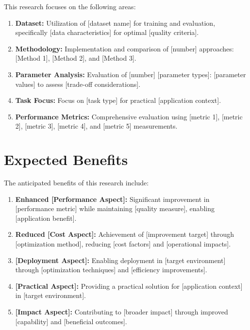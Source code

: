 This research focuses on the following areas:

\begin{enumerate}
\item \textbf{Dataset:} Utilization of [dataset name] for training and evaluation, specifically [data characteristics] for optimal [quality criteria].

\item \textbf{Methodology:} Implementation and comparison of [number] approaches: [Method 1], [Method 2], and [Method 3].

\item \textbf{Parameter Analysis:} Evaluation of [number] [parameter types]: [parameter values] to assess [trade-off considerations].

\item \textbf{Task Focus:} Focus on [task type] for practical [application context].

\item \textbf{Performance Metrics:} Comprehensive evaluation using [metric 1], [metric 2], [metric 3], [metric 4], and [metric 5] measurements.
\end{enumerate}

\section{Expected Benefits}

The anticipated benefits of this research include:

\begin{enumerate}
\item \textbf{Enhanced [Performance Aspect]:} Significant improvement in [performance metric] while maintaining [quality measure], enabling [application benefit].

\item \textbf{Reduced [Cost Aspect]:} Achievement of [improvement target] through [optimization method], reducing [cost factors] and [operational impacts].

\item \textbf{[Deployment Aspect]:} Enabling deployment in [target environment] through [optimization techniques] and [efficiency improvements].

\item \textbf{[Practical Aspect]:} Providing a practical solution for [application context] in [target environment].

\item \textbf{[Impact Aspect]:} Contributing to [broader impact] through improved [capability] and [beneficial outcomes].
\end{enumerate}